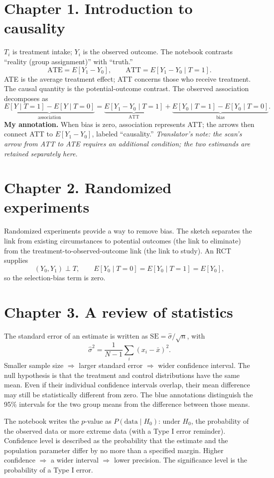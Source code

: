 \section{Chapter 1. Introduction to causality}
$T_i$ is treatment intake; $Y_i$ is the observed outcome. The notebook contrasts ``reality (group assignment)'' with ``truth.''
\[
\mathrm{ATE}=E[Y_1-Y_0],\qquad \mathrm{ATT}=E[Y_1-Y_0\mid T=1].
\]
ATE is the average treatment effect; ATT concerns those who receive treatment. The causal quantity is the potential-outcome contrast. The observed association decomposes as
\[
\underbrace{E[Y\mid T=1]-E[Y\mid T=0]}_{\text{association}}
=\underbrace{E[Y_1-Y_0\mid T=1]}_{\mathrm{ATT}}
+\underbrace{E[Y_0\mid T=1]-E[Y_0\mid T=0]}_{\text{bias}}.
\]
\textbf{My annotation.} When bias is zero, association represents ATT; the arrows then connect ATT to $E[Y_1-Y_0]$, labeled ``causality.'' \textit{Translator's note: the scan's arrow from ATT to ATE requires an additional condition; the two estimands are retained separately here.}

\section{Chapter 2. Randomized experiments}
Randomized experiments provide a way to remove bias. The sketch separates the link from existing circumstances to potential outcomes (the link to eliminate) from the treatment-to-observed-outcome link (the link to study). An RCT supplies
\[
(Y_0,Y_1)\perp T,\qquad E[Y_0\mid T=0]=E[Y_0\mid T=1]=E[Y_0],
\]
so the selection-bias term is zero.

\section{Chapter 3. A review of statistics}
The standard error of an estimate is written as $\mathrm{SE}=\hat\sigma/\sqrt n$, with
\[\hat\sigma^2=\frac{1}{N-1}\sum_i(x_i-\bar x)^2.\]
Smaller sample size $\Rightarrow$ larger standard error $\Rightarrow$ wider confidence interval. The null hypothesis is that the treatment and control distributions have the same mean. Even if their individual confidence intervals overlap, their mean difference may still be statistically different from zero. The blue annotations distinguish the 95\% intervals for the two group means from the difference between those means.

The notebook writes the $p$-value as $P(\text{data}\mid H_0)$: under $H_0$, the probability of the observed data or more extreme data (with a Type I error reminder). Confidence level is described as the probability that the estimate and the population parameter differ by no more than a specified margin. Higher confidence $\Rightarrow$ a wider interval $\Rightarrow$ lower precision. The significance level is the probability of a Type I error.

